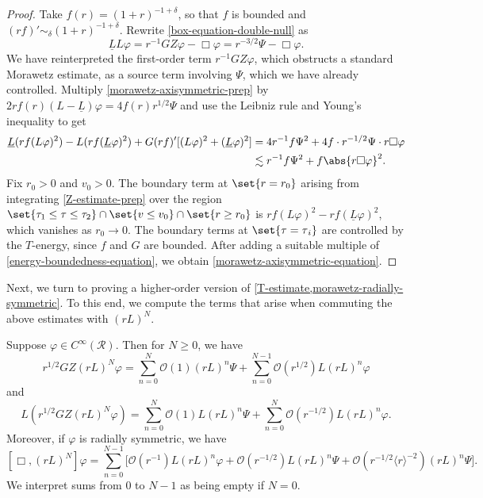 \documentclass[10pt, reqno]{amsart}
\begin{document}
\begin{proof}
Take \(f(r) = (1 + r)^{-1 + \delta{}}\), so that \(f\) is bounded and \((rf)'\sim _\delta{}(1 +
r)^{-1 + \delta{}}\). Rewrite \cref{box-equation-double-null} as
\begin{equation}\label{morawetz-axisymmetric-prep}
\underline{L}L\varphi{} = r^{-1}GZ\varphi{} - \Box{}\varphi{} = r^{-3/2}\Psi{} - \Box{}\varphi{}.
\end{equation}
We have reinterpreted the first-order term \(r^{-1}GZ\varphi{}\), which obstructs a
standard Morawetz estimate, as a source term involving \(\Psi{}\), which we have
already controlled. Multiply \cref{morawetz-axisymmetric-prep} by \(2rf(r)(L -
\underline{L})\varphi{} = 4f(r)r^{1/2}\Psi{}\) and use the Leibniz rule and
Young's inequality to get
\begin{equation}\label{Z-estimate-prep}
\begin{split}
\underline{L}(rf(L\varphi{})^2) - L(rf(\underline{L}\varphi{})^2) + G(rf)'[(L\varphi{})^2 + (\underline{L}\varphi{})^2] &= 4r^{-1}f\Psi^2 + 4f\cdot r^{-1/2}\Psi{}\cdot r\Box{}\varphi{} \\
&\lesssim r^{-1}f\Psi^2 + f\abs{r\Box{}\varphi{}}^2.
\end{split}
\end{equation}
Fix \(r_0>0\) and \(v_0>0\). The boundary term at \(\set{r=r_0}\) arising from
integrating \cref{Z-estimate-prep} over the region \(\set{\tau_1\le \tau{}\le
\tau_2}\cap \set{v\le v_0}\cap \set{r\ge r_0}\) is \(rf(L\varphi{})^2 -
rf(\underline{L}\varphi{})^2\), which vanishes as \(r_0\to 0\). The boundary
terms at \(\set{\tau{}=\tau{}_i}\) are controlled by the \(T\)-energy, since
\(f\) and \(G\) are bounded. After adding a suitable multiple of
\cref{energy-boundedness-equation}, we obtain \cref{morawetz-axisymmetric-equation}.
\end{proof}
Next, we turn to proving a higher-order version of
\cref{T-estimate,morawetz-radially-symmetric}. To this end, we compute the terms
that arise when commuting the above estimates with \((rL)^N\).
\begin{lemma}
Suppose \(\varphi{}\in C^\infty(\mathcal{R})\). Then for \(N\ge 0\), we have
\begin{equation}\label{Z-rL-phi}
r^{1/2}GZ(rL)^N\varphi{} = \sum_{n=0}^N \mathcal{O}(1)(rL)^n\Psi{} + \sum_{n=0}^{N-1}\mathcal{O}(r^{1/2})L(rL)^n\varphi{}
\end{equation}
and
\begin{equation}\label{L-Z-rL-phi}
L(r^{1/2}GZ(rL)^N\varphi{}) = \sum_{n=0}^N\mathcal{O}(1)L(rL)^n\Psi{} + \sum_{n=0}^N\mathcal{O}(r^{-1/2})L(rL)^n\varphi{}.
\end{equation}
Moreover, if \(\varphi{}\) is radially symmetric, we have
\begin{equation}\label{rL-commutation}
[\Box{},(rL)^N]\varphi{} = \sum_{n=0}^{N-1}\bigl[\mathcal{O}(r^{-1})L(rL)^n\varphi{} + \mathcal{O}(r^{-1/2})L(rL)^n\Psi{} + \mathcal{O}(r^{-1/2}\langle{}r\rangle^{-2})(rL)^n\Psi{}\bigr].
\end{equation}
We interpret sums from \(0\) to \(N-1\) as being empty if \(N = 0\).
\label{rL-commutation-lemma}
\end{lemma}
\end{document}
